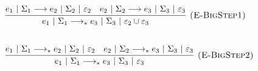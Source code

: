 \documentclass{llncs}
\begin{document}
\[
\begin{array}{lll}
			
			\infer[\textsc{(E-BigStep1)}]
			{e_1~|~\Sigma_1 \longrightarrow_* e_3~|~\Sigma_3~|~\varepsilon_2 \cup \varepsilon_3}
			{e_1~|~\Sigma_1 \longrightarrow e_2~|~\Sigma_2~|~\varepsilon_2
		  & e_2~|~\Sigma_2 \longrightarrow e_3~|~\Sigma_3~|~\varepsilon_3} \\[5ex]
			
			\infer[\textsc{(E-BigStep2)}]
			{e_1~|~\Sigma_1 \longrightarrow_* e_3~|~\Sigma_3~|~\varepsilon_3}
			{e_1~|~\Sigma_1 \longrightarrow_* e_2~|~\Sigma_2~|~\varepsilon_2 & e_2~|~\Sigma_2 \longrightarrow_* e_3~|~\Sigma_3~|~\varepsilon_3 }
			
		
\end{array}
\]
\end{document}
